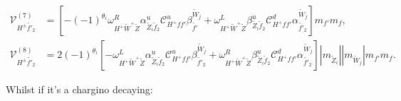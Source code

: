 \documentclass[final,3p,times]{elsarticle}
\begin{document}
\begin{align}
\mathcal{V}_{H^{\pm} \tilde{f'}_2}^{(7)} &= [-(-1)^{\theta_i}\omega_{H^+ \tilde{W}^+ \tilde{Z}}^R \alpha_{\tilde{Z}_i \tilde{f}_2}^{u} \mathcal{C}_{H^+ f f'}^u \beta_{\tilde{f'}}^{\tilde{W}_j} + \omega_{H^+ \tilde{W}^+ \tilde{Z}}^L \beta_{\tilde{Z}_i \tilde{f}_2}^{u} \mathcal{C}_{H^+ f f'}^d \alpha_{\tilde{f'}_2}^{\tilde{W}_j}]m_{f'}m_{f}, \\
\mathcal{V}_{H^{\pm} \tilde{f'}_2}^{(8)} &= 2(-1)^{\theta_i}[-\omega_{H^+ \tilde{W}^+ \tilde{Z}}^L \alpha_{\tilde{Z}_i \tilde{f}_2}^{u} \mathcal{C}_{H^+ f f'}^u \beta_{\tilde{f'}_2}^{\tilde{W}_j} + \omega_{H^+ \tilde{W}^+ \tilde{Z}}^R \beta_{\tilde{Z}_i \tilde{f}_2}^{u} \mathcal{C}_{H^+ f f'}^d \alpha_{\tilde{f'}_2}^{\tilde{W}_j}]|m_{\tilde{Z}_i}||m_{\tilde{W}_j}|m_{f'}m_{f}.
\end{align}


Whilst if it's a chargino decaying:
\end{document}
